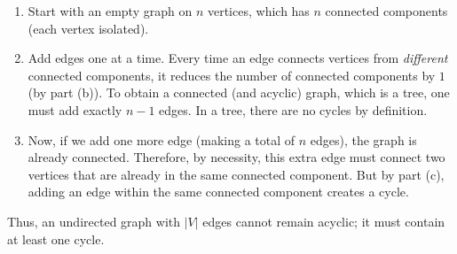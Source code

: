 \documentclass[11pt]{article}
\begin{document}
    \begin{enumerate}
        \item Start with an empty graph on \(n\) vertices, which has \(n\) connected components (each vertex isolated).
        
        \item Add edges one at a time. Every time an edge connects vertices from \emph{different} connected components, it reduces the number of connected components by \(1\) (by part (b)). To obtain a connected (and acyclic) graph, which is a tree, one must add exactly \(n-1\) edges. In a tree, there are no cycles by definition.
        
        \item Now, if we add one more edge (making a total of \(n\) edges), the graph is already connected. Therefore, by necessity, this extra edge must connect two vertices that are already in the same connected component. But by part (c), adding an edge within the same connected component creates a cycle.
    \end{enumerate}
    
    Thus, an undirected graph with \(|V|\) edges cannot remain acyclic; it must contain at least one cycle.
           
\end{document}
